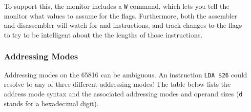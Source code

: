 \documentclass{report}
\begin{document}
    To support this, the monitor includes a \verb+W+ command, which lets you tell the monitor
    what values to assume for the flags. Furthermore, both the assembler and disassembler will
    watch for  and  instructions, and track changes to the flags to
    try to be intelligent about the the lengths of those instructions.

    \subsubsection*{Addressing Modes}

    Addressing modes on the 65816 can be ambiguous.
    An instruction \verb+LDA $26+ could resolve to any of three different addressing modes!
    The table below lists the address
    mode syntax and the associated addressing modes and operand sizes (\verb+d+ stands for a
    hexadecimal digit).
\end{document}
